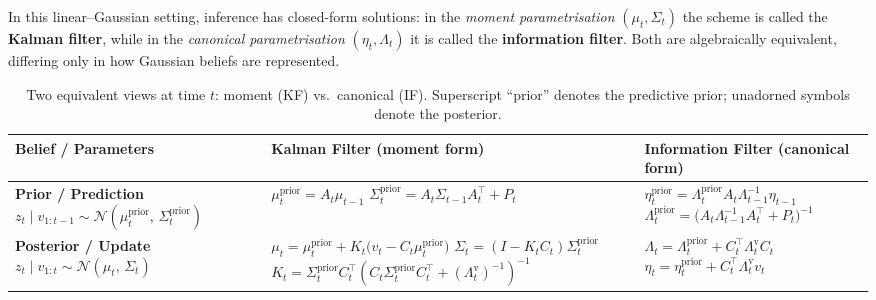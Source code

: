 \documentclass{article}
\begin{document}
In this linear--Gaussian setting, inference has closed-form solutions:
in the \emph{moment parametrisation} \((\mu_t,\Sigma_t)\) the scheme is called the \textbf{Kalman filter},
while in the \emph{canonical parametrisation} \((\eta_t,\Lambda_t)\) it is called the \textbf{information filter}.
Both are algebraically equivalent, differing only in how Gaussian beliefs are represented.

\vspace{4pt}
\begin{table}[h]
\centering
\caption{Two equivalent views at time \(t\): moment (KF) vs.\ canonical (IF). Superscript ``prior'' denotes the predictive prior; unadorned symbols denote the posterior.}
\label{tab:kf-if-side-by-side}
\setlength{\tabcolsep}{6pt}
\renewcommand{\arraystretch}{1.35}
\small
\begin{tabular}{p{} p{} p{}}
\toprule
\textbf{Belief / Parameters}
& \textbf{Kalman Filter (moment form)}
& \textbf{Information Filter (canonical form)}\\
\midrule
\textbf{Prior / Prediction} \newline
$\displaystyle z_t \mid v_{1:t-1} \sim \mathcal N(\mu_t^{\mathrm{prior}},\,\Sigma_t^{\mathrm{prior}})\quad$
&
\(\mu_t^{\mathrm{prior}} = A_t \mu_{t-1}\) \newline
\(\Sigma_t^{\mathrm{prior}} = A_t \Sigma_{t-1} A_t^\top + P_t\)
&
\(\displaystyle \eta_t^{\mathrm{prior}} = \Lambda_t^{\mathrm{prior}} A_t \Lambda_{t-1}^{-1} \eta_{t-1}\)
\newline
\(\displaystyle \Lambda_t^{\mathrm{prior}} = \big(A_t \Lambda_{t-1}^{-1} A_t^\top + P_t\big)^{-1}\)

\\
\midrule
\textbf{Posterior / Update} \newline
$\displaystyle z_t \mid v_{1:t} \sim \mathcal N(\mu_t,\,\Sigma_t)\quad$
&
\(\mu_t = \mu_t^{\mathrm{prior}} + K_t\big(v_t - C_t \mu_t^{\mathrm{prior}}\big)\) \newline
\(\Sigma_t = (I - K_t C_t)\Sigma_t^{\mathrm{prior}} \)  \newline
\(K_t = \Sigma_t^{\mathrm{prior}} C_t^\top (C_t \Sigma_t^{\mathrm{prior}} C_t^\top + (\Lambda^{\mathrm{v}}_t)^{-1})^{-1}\)
&
\(\displaystyle \Lambda_t = \Lambda_t^{\mathrm{prior}} + C_t^\top \Lambda^{\mathrm{v}}_t C_t\) \newline
\(\displaystyle \eta_t = \eta_t^{\mathrm{prior}} + C_t^\top \Lambda^{\mathrm{v}}_t v_t\)
\\
\bottomrule
\end{tabular}
\end{table}
\end{document}
